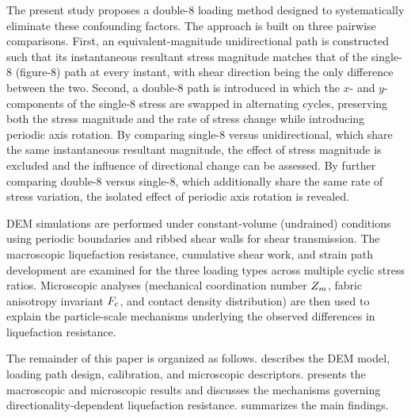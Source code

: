The present study proposes a double-8 loading method designed to systematically eliminate these confounding factors. The approach is built on three pairwise comparisons. First, an equivalent-magnitude unidirectional path is constructed such that its instantaneous resultant stress magnitude matches that of the single-8 (figure-8) path at every instant, with shear direction being the only difference between the two. Second, a double-8 path is introduced in which the $x$- and $y$-components of the single-8 stress are swapped in alternating cycles, preserving both the stress magnitude and the rate of stress change while introducing periodic axis rotation. By comparing single-8 versus unidirectional, which share the same instantaneous resultant magnitude, the effect of stress magnitude is excluded and the influence of directional change can be assessed. By further comparing double-8 versus single-8, which additionally share the same rate of stress variation, the isolated effect of periodic axis rotation is revealed.

DEM simulations are performed under constant-volume (undrained) conditions using periodic boundaries and ribbed shear walls for shear transmission. The macroscopic liquefaction resistance, cumulative shear work, and strain path development are examined for the three loading types across multiple cyclic stress ratios. Microscopic analyses (mechanical coordination number $Z_m$, fabric anisotropy invariant $F_c$, and contact density distribution) are then used to explain the particle-scale mechanisms underlying the observed differences in liquefaction resistance.

The remainder of this paper is organized as follows.  describes the DEM model, loading path design, calibration, and microscopic descriptors.  presents the macroscopic and microscopic results and discusses the mechanisms governing directionality-dependent liquefaction resistance.  summarizes the main findings.
